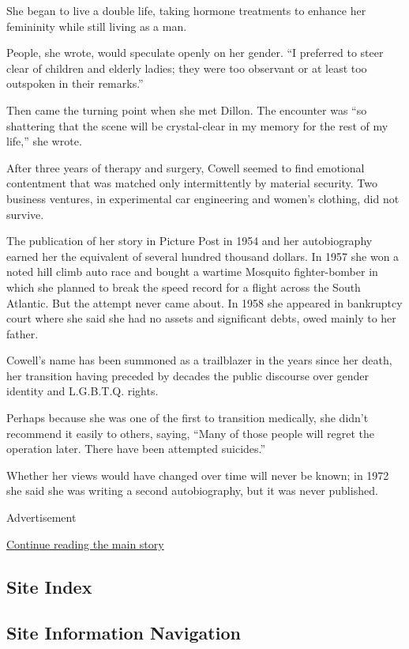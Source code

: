 She began to live a double life, taking hormone treatments to enhance
her femininity while still living as a man.

People, she wrote, would speculate openly on her gender. ``I preferred
to steer clear of children and elderly ladies; they were too observant
or at least too outspoken in their remarks.''

Then came the turning point when she met Dillon. The encounter was ``so
shattering that the scene will be crystal-clear in my memory for the
rest of my life,'' she wrote.

After three years of therapy and surgery, Cowell seemed to find
emotional contentment that was matched only intermittently by material
security. Two business ventures, in experimental car engineering and
women's clothing, did not survive.

The publication of her story in Picture Post in 1954 and her
autobiography earned her the equivalent of several hundred thousand
dollars. In 1957 she won a noted hill climb auto race and bought a
wartime Mosquito fighter-bomber in which she planned to break the speed
record for a flight across the South Atlantic. But the attempt never
came about. In 1958 she appeared in bankruptcy court where she said she
had no assets and significant debts, owed mainly to her father.

Cowell's name has been summoned as a trailblazer in the years since her
death, her transition having preceded by decades the public discourse
over gender identity and L.G.B.T.Q. rights.

Perhaps because she was one of the first to transition medically, she
didn't recommend it easily to others, saying, ``Many of those people
will regret the operation later. There have been attempted suicides.''

Whether her views would have changed over time will never be known; in
1972 she said she was writing a second autobiography, but it was never
published.

Advertisement

\protect\hyperlink{after-bottom}{Continue reading the main story}

\hypertarget{site-index}{%
\subsection{Site Index}\label{site-index}}

\hypertarget{site-information-navigation}{%
\subsection{Site Information
Navigation}\label{site-information-navigation}}

